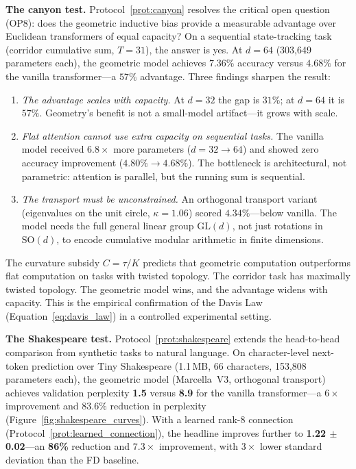 \documentclass[11pt,a4paper]{article}
\theoremstyle{definition}
\theoremstyle{remark}
\newcommand{\SO}{\mathrm{SO}}
\begin{document}
\textbf{The canyon test.} Protocol~\ref{prot:canyon} resolves 
the critical open question (OP8): does the geometric inductive 
bias provide a measurable advantage over Euclidean transformers 
of equal capacity? On a sequential state-tracking task (corridor 
cumulative sum, $T = 31$), the answer is yes. At $d = 64$ 
(303{,}649 parameters each), the geometric model achieves 
$7.36\%$ accuracy versus $4.68\%$ for the vanilla 
transformer---a $57\%$ advantage. Three findings sharpen the 
result:
\begin{enumerate}[nosep]
  \item \emph{The advantage scales with capacity.} At $d = 32$ 
  the gap is $31\%$; at $d = 64$ it is $57\%$. Geometry's 
  benefit is not a small-model artifact---it grows with scale.
  \item \emph{Flat attention cannot use extra capacity on 
  sequential tasks.} The vanilla model received $6.8\times$ more 
  parameters ($d = 32 \to 64$) and showed zero accuracy 
  improvement ($4.80\% \to 4.68\%$). The bottleneck is 
  architectural, not parametric: attention is parallel, but the 
  running sum is sequential.
  \item \emph{The transport must be unconstrained.} An 
  orthogonal transport variant (eigenvalues on the unit circle, 
  $\kappa = 1.06$) scored $4.34\%$---below vanilla. The model 
  needs the full general linear group $\mathrm{GL}(d)$, not 
  just rotations in $\SO(d)$, to encode cumulative modular 
  arithmetic in finite dimensions.
\end{enumerate}

The curvature subsidy $C = \tau/K$ predicts that geometric 
computation outperforms flat computation on tasks with twisted 
topology. The corridor task has maximally twisted topology. The 
geometric model wins, and the advantage widens with capacity. 
This is the empirical confirmation of the Davis Law 
(Equation~\ref{eq:davis_law}) in a controlled experimental 
setting.

\medskip

\textbf{The Shakespeare test.} Protocol~\ref{prot:shakespeare} 
extends the head-to-head comparison from synthetic tasks to 
natural language. On character-level next-token prediction over 
Tiny Shakespeare (1.1\,MB, 66 characters, 153{,}808 parameters 
each), the geometric model (Marcella~V3, orthogonal transport) 
achieves validation perplexity \textbf{1.5} versus \textbf{8.9} 
for the vanilla transformer---a $6\times$ improvement and 
$83.6\%$ reduction in perplexity 
(Figure~\ref{fig:shakespeare_curves}). With a learned rank-8 
connection (Protocol~\ref{prot:learned_connection}), the headline 
improves further to \textbf{1.22 $\pm$ 0.02}---an \textbf{86\%} 
reduction and $7.3\times$ improvement, with $3\times$ lower 
standard deviation than the FD baseline.
\end{document}
